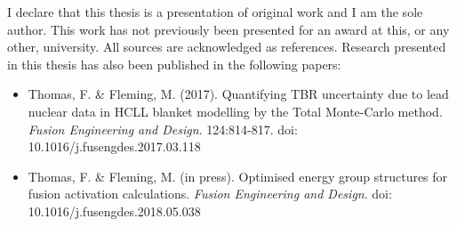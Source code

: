 
\begin{declaration}

I declare that this thesis is a presentation of original work and I am the sole author. This work has not previously been presented for an award at this, or any other, university. All sources are acknowledged as references. Research presented in this thesis has also been published in the following papers:

\begin{itemize}
  \item Thomas, F. \& Fleming, M. (2017). Quantifying TBR uncertainty due to lead nuclear data in HCLL blanket modelling by the Total Monte-Carlo method. \textit{Fusion Engineering and Design}. 124:814-817. doi: 10.1016/j.fusengdes.2017.03.118

  \item Thomas, F. \& Fleming, M. (in press). Optimised energy group structures for fusion activation calculations. \textit{Fusion Engineering and Design}. doi: 10.1016/j.fusengdes.2018.05.038
\end{itemize}

\end{declaration}
